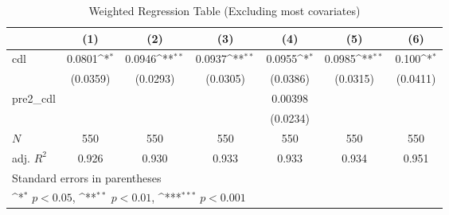 \begin{table}[htbp]\centering
\def\sym#1{\ifmmode^{#1}\else\(^{#1}\)\fi}
\caption{Weighted Regression Table (Excluding most covariates)\label{tab2}}
\begin{tabular}{l*{6}{c}}
\toprule
            &\multicolumn{1}{c}{(1)}         &\multicolumn{1}{c}{(2)}         &\multicolumn{1}{c}{(3)}         &\multicolumn{1}{c}{(4)}         &\multicolumn{1}{c}{(5)}         &\multicolumn{1}{c}{(6)}         \\
\midrule
cdl         &      0.0801\sym{*}  &      0.0946\sym{**} &      0.0937\sym{**} &      0.0955\sym{*}  &      0.0985\sym{**} &       0.100\sym{*}  \\
            &    (0.0359)         &    (0.0293)         &    (0.0305)         &    (0.0386)         &    (0.0315)         &    (0.0411)         \\
\addlinespace
pre2\_cdl    &                     &                     &                     &     0.00398         &                     &                     \\
            &                     &                     &                     &    (0.0234)         &                     &                     \\
\midrule
\(N\)       &         550         &         550         &         550         &         550         &         550         &         550         \\
adj. \(R^{2}\)&       0.926         &       0.930         &       0.933         &       0.933         &       0.934         &       0.951         \\
\bottomrule
\multicolumn{7}{l}{\footnotesize Standard errors in parentheses}\\
\multicolumn{7}{l}{\footnotesize \sym{*} \(p<0.05\), \sym{**} \(p<0.01\), \sym{***} \(p<0.001\)}\\
\end{tabular}
\end{table}
